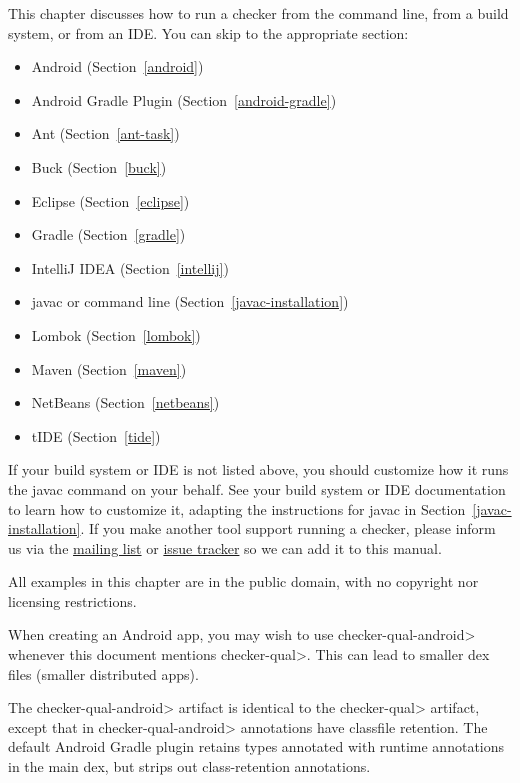 \htmlhr
{}

This chapter discusses how to run a checker from the command line, from a
build system, or from an IDE\@.  You can skip to the appropriate section:

\begin{itemize}
\item Android (Section~\ref{android})
\item Android Gradle Plugin (Section~\ref{android-gradle})
\item Ant (Section~\ref{ant-task})
\item Buck (Section~\ref{buck})
\item Eclipse (Section~\ref{eclipse})
\item Gradle (Section~\ref{gradle})
\item IntelliJ IDEA (Section~\ref{intellij})
\item javac or command line (Section~\ref{javac-installation})
\item Lombok (Section~\ref{lombok})
\item Maven (Section~\ref{maven})
\item NetBeans (Section~\ref{netbeans})
\item tIDE (Section~\ref{tide})
\end{itemize}

If your build system or IDE is not listed above, you should customize how
it runs the javac command on your behalf.  See your build system or IDE
documentation to learn how to
customize it, adapting the instructions for javac in Section~\ref{javac-installation}.
If you make another tool support running a checker, please
inform us via the
\href{https://groups.google.com/forum/#!forum/checker-framework-discuss}{mailing
  list} or
\href{https://github.com/typetools/checker-framework/issues}{issue tracker} so
we can add it to this manual.

All examples in this chapter are in the public domain, with no copyright nor
licensing restrictions.



When creating an Android app, you may wish to use \<checker-qual-android>
whenever this document mentions \<checker-qual>.  This can lead to smaller
dex files (smaller distributed apps).

The \<checker-qual-android> artifact is identical to the \<checker-qual>
artifact, except that in \<checker-qual-android> annotations have classfile
retention.  The default Android Gradle plugin retains types annotated with
runtime annotations in the main dex, but strips out class-retention
annotations.


